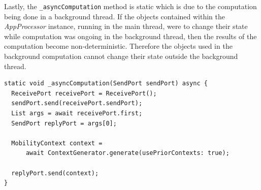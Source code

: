 Lastly, the \verb|_asyncComputation| method is static which is due to the computation being done in a background thread. If the objects contained within the \textit{AppProcessor} instance, running in the main thread, were to change their state while computation was ongoing in the background thread, then the results of the computation become non-deterministic. Therefore the objects used in the background computation cannot change their state outside the background thread. 

\begin{verbatim}
static void _asyncComputation(SendPort sendPort) async {
  ReceivePort receivePort = ReceivePort();
  sendPort.send(receivePort.sendPort);
  List args = await receivePort.first;
  SendPort replyPort = args[0];

  MobilityContext context =
      await ContextGenerator.generate(usePriorContexts: true);

  replyPort.send(context);
}
\end{verbatim}

